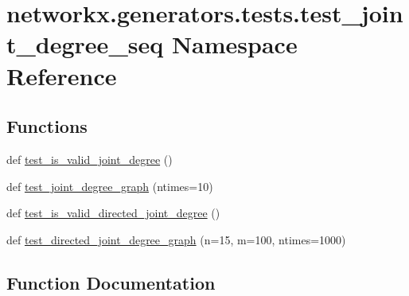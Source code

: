 \hypertarget{namespacenetworkx_1_1generators_1_1tests_1_1test__joint__degree__seq}{}\section{networkx.\+generators.\+tests.\+test\+\_\+joint\+\_\+degree\+\_\+seq Namespace Reference}
\label{namespacenetworkx_1_1generators_1_1tests_1_1test__joint__degree__seq}
\subsection*{Functions}
\begin{DoxyCompactItemize}
\item 
def \hyperlink{namespacenetworkx_1_1generators_1_1tests_1_1test__joint__degree__seq_a1b053140a51a50cac3bcc7c696f6ab78}{test\+\_\+is\+\_\+valid\+\_\+joint\+\_\+degree} ()
\item 
def \hyperlink{namespacenetworkx_1_1generators_1_1tests_1_1test__joint__degree__seq_a848b60b78e3d63cec7cd6ebf849eb609}{test\+\_\+joint\+\_\+degree\+\_\+graph} (ntimes=10)
\item 
def \hyperlink{namespacenetworkx_1_1generators_1_1tests_1_1test__joint__degree__seq_a041bc3f53807b6c1b28a3a363b28ce26}{test\+\_\+is\+\_\+valid\+\_\+directed\+\_\+joint\+\_\+degree} ()
\item 
def \hyperlink{namespacenetworkx_1_1generators_1_1tests_1_1test__joint__degree__seq_acd6e9159d5af4a5c98c7bed8df91f4a6}{test\+\_\+directed\+\_\+joint\+\_\+degree\+\_\+graph} (n=15, m=100, ntimes=1000)
\end{DoxyCompactItemize}


\subsection{Function Documentation}
\mbox{\label{namespacenetworkx_1_1generators_1_1tests_1_1test__joint__degree__seq_acd6e9159d5af4a5c98c7bed8df91f4a6}} 
